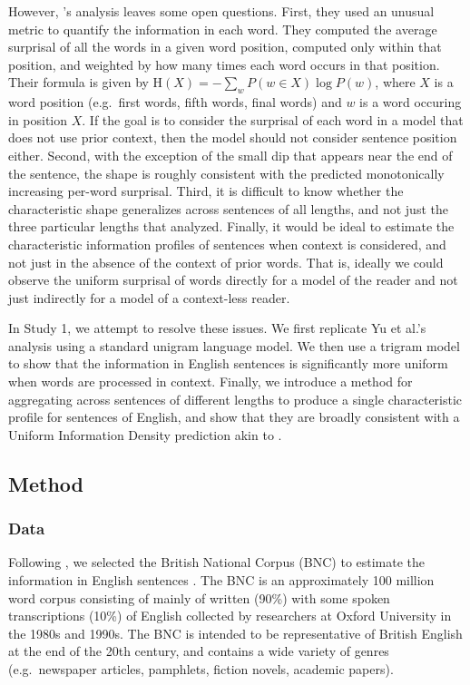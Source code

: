 \documentclass[entropy,article,submit,moreauthors,pdftex]{mdpi}
\begin{document}
However, \citet{yu2016}'s analysis leaves some open questions. First,
they used an unusual metric to quantify the information in each word.
They computed the average surprisal of all the words in a given word
position, computed only within that position, and weighted by how many
times each word occurs in that position. Their formula is given by
\(\text{H}(X) = -\sum_{w}P(w \in X) \log P(w)\), where \(X\) is a word
position (e.g.~first words, fifth words, final words) and \(w\) is a
word occuring in position \(X\). If the goal is to consider the
surprisal of each word in a model that does not use prior context, then
the model should not consider sentence position either. Second, with the
exception of the small dip that appears near the end of the sentence,
the shape is roughly consistent with the predicted monotonically
increasing per-word surprisal. Third, it is difficult to know whether
the characteristic shape generalizes across sentences of all lengths,
and not just the three particular lengths that \citet{yu2016} analyzed.
Finally, it would be ideal to estimate the characteristic information
profiles of sentences when context is considered, and not just in the
absence of the context of prior words. That is, ideally we could observe
the uniform surprisal of words directly for a model of the reader and
not just indirectly for a model of a context-less reader.

In Study 1, we attempt to resolve these issues. We first replicate Yu et
al.'s analysis using a standard unigram language model. We then use a
trigram model to show that the information in English sentences is
significantly more uniform when words are processed in context. Finally,
we introduce a method for aggregating across sentences of different
lengths to produce a single characteristic profile for sentences of
English, and show that they are broadly consistent with a Uniform
Information Density prediction akin to \citet{genzel2002}.

\hypertarget{method}{%
\subsection{Method}\label{method}}

\hypertarget{data}{%
\subsubsection{Data}\label{data}}

Following \citet{yu2016}, we selected the British National Corpus (BNC)
to estimate the information in English sentences \citep{leech1992}. The
BNC is an approximately 100 million word corpus consisting of mainly of
written (90\%) with some spoken transcriptions (10\%) of English
collected by researchers at Oxford University in the 1980s and 1990s.
The BNC is intended to be representative of British English at the end
of the 20th century, and contains a wide variety of genres
(e.g.~newspaper articles, pamphlets, fiction novels, academic papers).
\end{document}
